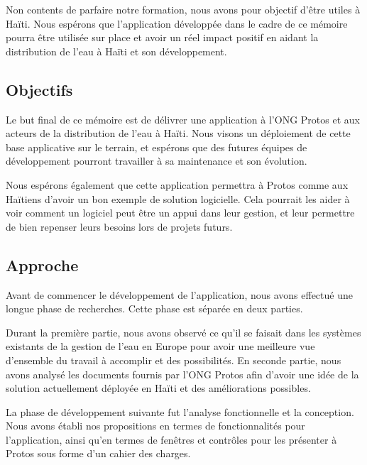 \documentclass{EPL-master-thesis-covers-FR}
\begin{document}
			Non contents de parfaire notre formation, nous avons pour objectif d'être utiles à Haïti. Nous espérons que l'application développée dans le cadre de ce mémoire pourra être utilisée sur place et avoir un réel impact positif en aidant la distribution de l'eau à Haïti et son développement.

		\subsection*{Objectifs}

			Le but final de ce mémoire est de délivrer une application à l'ONG Protos et aux acteurs de la distribution de l'eau à Haïti. Nous visons un déploiement de cette base applicative sur le terrain, et espérons que des futures équipes de développement pourront travailler à sa maintenance et son évolution.

			Nous espérons également que cette application permettra à Protos comme aux Haïtiens d'avoir un bon exemple de solution logicielle. Cela pourrait les aider à voir comment un logiciel peut être un appui dans leur gestion, et leur permettre de bien repenser leurs besoins lors de projets futurs.

		\subsection*{Approche}

			Avant de commencer le développement de l'application, nous avons effectué une longue phase de recherches. Cette phase est séparée en deux parties.

			Durant la première partie, nous avons observé ce qu'il se faisait dans les systèmes existants de la gestion de l'eau en Europe pour avoir une meilleure vue d'ensemble du travail à accomplir et des possibilités. En seconde partie, nous avons analysé les documents fournis par l'ONG Protos afin d'avoir une idée de la solution actuellement déployée en Haïti et des améliorations possibles.

			La phase de développement suivante fut l'analyse fonctionnelle et la conception. Nous avons établi nos propositions en termes de fonctionnalités pour l'application, ainsi qu'en termes de fenêtres et contrôles pour les présenter à Protos sous forme d'un cahier des charges.
\end{document}

